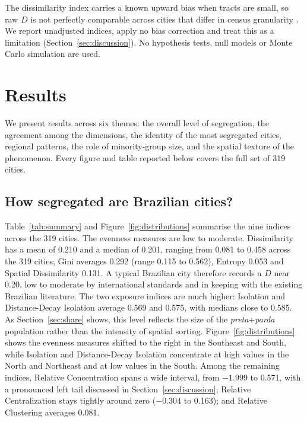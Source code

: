 \documentclass[12pt,a4paper]{article}
\begin{document}
The dissimilarity index carries a known upward bias when tracts are small, so raw $D$ is not perfectly comparable across cities that differ in census granularity \citep{cortese1976further, carrington1997measuring, allen2015more}. We report unadjusted indices, apply no bias correction and treat this as a limitation (Section~\ref{sec:discussion}). No hypothesis tests, null models or Monte Carlo simulation are used.

\section{Results}\label{sec:results}

We present results across six themes: the overall level of segregation, the agreement among the dimensions, the identity of the most segregated cities, regional patterns, the role of minority-group size, and the spatial texture of the phenomenon. Every figure and table reported below covers the full set of 319 cities.

\subsection{How segregated are Brazilian cities?}\label{sec:dist}

Table~\ref{tab:summary} and Figure~\ref{fig:distributions} summarise the nine indices across the 319 cities. The evenness measures are low to moderate. Dissimilarity has a mean of 0.210 and a median of 0.201, ranging from 0.081 to 0.458 across the 319 cities; Gini averages 0.292 (range 0.115 to 0.562), Entropy 0.053 and Spatial Dissimilarity 0.131. A typical Brazilian city therefore records a $D$ near 0.20, low to moderate by international standards and in keeping with the existing Brazilian literature. The two exposure indices are much higher: Isolation and Distance-Decay Isolation average 0.569 and 0.575, with medians close to 0.585. As Section~\ref{sec:share} shows, this level reflects the size of the \emph{preta}$+$\emph{parda} population rather than the intensity of spatial sorting. Figure~\ref{fig:distributions} shows the evenness measures shifted to the right in the Southeast and South, while Isolation and Distance-Decay Isolation concentrate at high values in the North and Northeast and at low values in the South. Among the remaining indices, Relative Concentration spans a wide interval, from $-1.999$ to 0.571, with a pronounced left tail discussed in Section~\ref{sec:discussion}; Relative Centralization stays tightly around zero ($-0.304$ to 0.163); and Relative Clustering averages 0.081.
\end{document}
